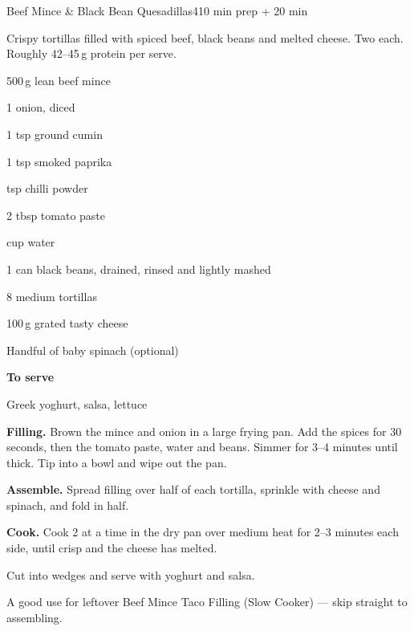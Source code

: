 \begin{recipebox}{Beef Mince \& Black Bean Quesadillas}{4}{10 min prep + 20 min}

Crispy tortillas filled with spiced beef, black beans and melted cheese. Two
each. Roughly 42--45\,g protein per serve.

\begin{ingredients}
  \item 500\,g lean beef mince
  \item 1 onion, diced
  \item 1 tsp ground cumin
  \item 1 tsp smoked paprika
  \item {} tsp chilli powder
  \item 2 tbsp tomato paste
  \item {} cup water
  \item 1 can black beans, drained, rinsed and lightly mashed
  \item 8 medium tortillas
  \item 100\,g grated tasty cheese
  \item Handful of baby spinach (optional)
  \item[] \textbf{To serve}
  \item Greek yoghurt, salsa, lettuce
\end{ingredients}

\begin{method}
  \item \textbf{Filling.} Brown the mince and onion in a large frying pan. Add the spices for 30 seconds, then the tomato paste, water and beans. Simmer for 3--4 minutes until thick. Tip into a bowl and wipe out the pan.
  \item \textbf{Assemble.} Spread filling over half of each tortilla, sprinkle with cheese and spinach, and fold in half.
  \item \textbf{Cook.} Cook 2 at a time in the dry pan over medium heat for 2--3 minutes each side, until crisp and the cheese has melted.
  \item Cut into wedges and serve with yoghurt and salsa.
\end{method}

\begin{notelist}
  \item A good use for leftover Beef Mince Taco Filling (Slow Cooker) --- skip straight to assembling.
\end{notelist}

\end{recipebox}
